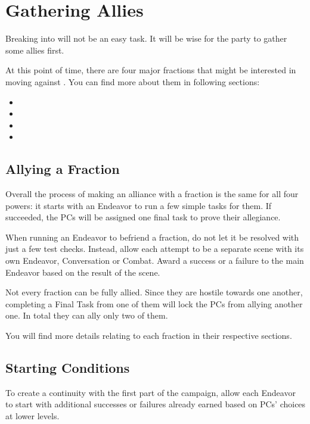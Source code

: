\section{Gathering Allies}
\label{sec:gatheringAllies}

Breaking into  will not be an easy task. It will be wise for the party to gather some allies first.

At this point of time, there are four major fractions that might be interested in moving against \npcQueen{}. You can find more about them in following sections:

\begin{itemize}
	\item {}
	\item {}
	\item {}
	\item {}
\end{itemize}




\subsection{Allying a Fraction}

Overall the process of making an alliance with a fraction is the same for all four powers: it starts with an Endeavor to run a few simple tasks for them. If succeeded, the PCs will be assigned one final task to prove their allegiance.

When running an Endeavor to befriend a fraction, do not let it be resolved with just a few test checks. Instead, allow each attempt to be a separate scene with its own Endeavor, Conversation or Combat. Award a success or a failure to the main Endeavor based on the result of the scene.

Not every fraction can be fully allied. Since they are hostile towards one another, completing a Final Task from one of them will lock the PCs from allying another one. In total they can ally only two of them.

You will find more details relating to each fraction in their respective sections.


\subsection{Starting Conditions}

To create a continuity with the first part of the campaign, allow each Endeavor to start with additional successes or failures already earned based on PCs' choices at lower levels.

